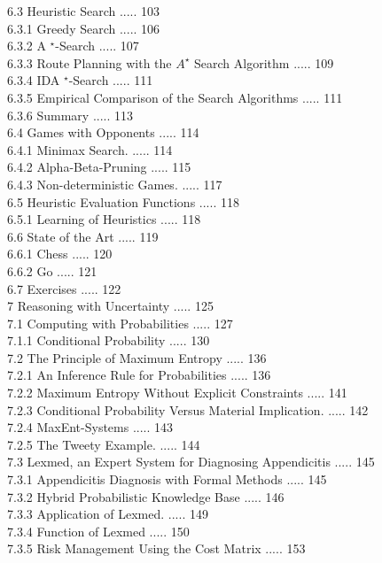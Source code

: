 \documentclass[10pt]{book}
\begin{document}
6.3 Heuristic Search ..... 103\\
6.3.1 Greedy Search ..... 106\\
6.3.2 A ${ }^{\star}$-Search ..... 107\\
6.3.3 Route Planning with the $A^{\star}$ Search Algorithm ..... 109\\
6.3.4 IDA ${ }^{\star}$-Search ..... 111\\
6.3.5 Empirical Comparison of the Search Algorithms ..... 111\\
6.3.6 Summary ..... 113\\
6.4 Games with Opponents ..... 114\\
6.4.1 Minimax Search. ..... 114\\
6.4.2 Alpha-Beta-Pruning ..... 115\\
6.4.3 Non-deterministic Games. ..... 117\\
6.5 Heuristic Evaluation Functions ..... 118\\
6.5.1 Learning of Heuristics ..... 118\\
6.6 State of the Art ..... 119\\
6.6.1 Chess ..... 120\\
6.6.2 Go ..... 121\\
6.7 Exercises ..... 122\\
7 Reasoning with Uncertainty ..... 125\\
7.1 Computing with Probabilities ..... 127\\
7.1.1 Conditional Probability ..... 130\\
7.2 The Principle of Maximum Entropy ..... 136\\
7.2.1 An Inference Rule for Probabilities ..... 136\\
7.2.2 Maximum Entropy Without Explicit Constraints ..... 141\\
7.2.3 Conditional Probability Versus Material Implication. ..... 142\\
7.2.4 MaxEnt-Systems ..... 143\\
7.2.5 The Tweety Example. ..... 144\\
7.3 Lexmed, an Expert System for Diagnosing Appendicitis ..... 145\\
7.3.1 Appendicitis Diagnosis with Formal Methods ..... 145\\
7.3.2 Hybrid Probabilistic Knowledge Base ..... 146\\
7.3.3 Application of Lexmed. ..... 149\\
7.3.4 Function of Lexmed ..... 150\\
7.3.5 Risk Management Using the Cost Matrix ..... 153\\
\end{document}
